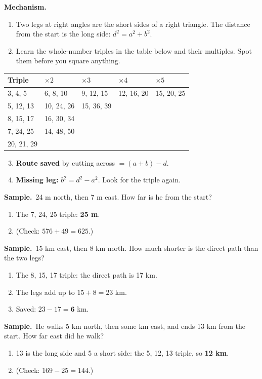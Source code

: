 \documentclass[11pt,a4paper]{article}
\newcommand{\mech}{\textbf{\color{ember}Mechanism.}\ }
\newif\ifkeepsamp
\newcommand{\samp}{\ifkeepsamp\needspace{4\baselineskip}\fi\textbf{\color{ember}Sample.}\ }
\begin{document}
\mech
\begin{enumerate}
\item Two legs at right angles are the short sides of a right triangle. The distance from the start is the long side: $d^2 = a^2 + b^2$.
\item Learn the whole-number triples in the table below and their multiples. Spot them before you square anything.
\end{enumerate}
\begin{center}\small\renewcommand{\arraystretch}{1.18}\setlength{\tabcolsep}{9pt}
\begin{tabular}{@{}lllll@{}}
\toprule
\textbf{\color{slate}Triple} & \textbf{\color{slate}$\times 2$} & \textbf{\color{slate}$\times 3$} & \textbf{\color{slate}$\times 4$} & \textbf{\color{slate}$\times 5$} \\ \midrule
3, 4, 5 & 6, 8, 10 & 9, 12, 15 & 12, 16, 20 & 15, 20, 25 \\
5, 12, 13 & 10, 24, 26 & 15, 36, 39 & & \\
8, 15, 17 & 16, 30, 34 & & & \\
7, 24, 25 & 14, 48, 50 & & & \\
20, 21, 29 & & & & \\
\bottomrule
\end{tabular}\end{center}
\begin{enumerate}
\setcounter{enumi}{2}
\item \textbf{Route saved} by cutting across $= (a + b) - d$.
\item \textbf{Missing leg:} $b^2 = d^2 - a^2$. Look for the triple again.
\end{enumerate}

\samp 24 m north, then 7 m east. How far is he from the start?
\begin{enumerate}
\item The 7, 24, 25 triple: \textbf{25 m}.
\item (Check: $576 + 49 = 625$.)
\end{enumerate}
\samp 15 km east, then 8 km north. How much shorter is the direct path than the two legs?
\begin{enumerate}
\item The 8, 15, 17 triple: the direct path is 17 km.
\item The legs add up to $15 + 8 = 23$ km.
\item Saved: $23 - 17 = \mathbf{6}$ km.
\end{enumerate}
\samp He walks 5 km north, then some km east, and ends 13 km from the start. How far east did he walk?
\begin{enumerate}
\item 13 is the long side and 5 a short side: the 5, 12, 13 triple, so \textbf{12 km}.
\item (Check: $169 - 25 = 144$.)
\end{enumerate}
\end{document}
